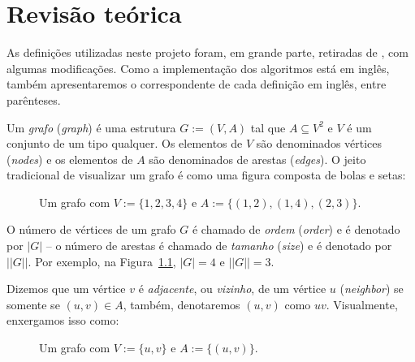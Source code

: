 \chapter{Revisão teórica}
\label{ch:revisão}

As definições utilizadas neste projeto foram, em grande parte,
retiradas de \cite{diestel2025graph}, com algumas modificações. Como
a implementação dos algoritmos está em inglês, também apresentaremos
o correspondente de cada definição em inglês, entre parênteses.

\begin{mydef}[Grafo]
  Um \emph{grafo} (\textit{graph}) é uma estrutura $G := (V, A)$
  tal que $A \subseteq V^2$ e $V$ é um conjunto de um tipo qualquer.
  Os elementos de $V$ são denominados vértices (\textit{nodes}) e os
  elementos de $A$ são denominados de arestas
  (\textit{edges}). O jeito tradicional de visualizar um
  grafo é como uma figura composta de bolas e setas:
  \begin{figure}[h]
    \centering
    \caption{Um grafo com $V := \{1,2,3,4\}$ e $A :=
    \{(1,2),(1,4),(2,3)\}.$}
    \label{fig:graph1}
  \end{figure}
  \FloatBarrier
\end{mydef}

\begin{mydef}
  O número de vértices de um grafo $G$ é chamado de \emph{ordem}
  (\textit{order}) e é denotado por $|G|$ -- o número de arestas é chamado de
  \emph{tamanho} (\textit{size}) e é denotado por $||G||$. Por exemplo, na
  Figura~\ref{fig:graph1}, $|G| = 4$ e $||G|| = 3$.
\end{mydef}

\begin{mydef}[Adjacência]
  Dizemos que um vértice $v$ é \emph{adjacente}, ou \emph{vizinho},
  de um vértice
  $u$ (\textit{neighbor}) se somente se $(u,v) \in A$, também,
  denotaremos $(u,v)$ como $uv$. Visualmente,
  enxergamos isso como:
  \begin{figure}[h]
    \centering
    \caption{Um grafo com $V := \{u,v\}$ e $A :=
    \{(u,v)\}.$}
  \end{figure}
  \FloatBarrier
\end{mydef}

